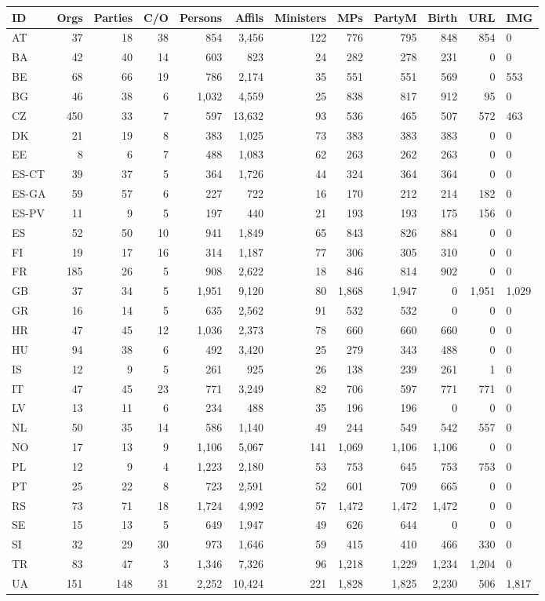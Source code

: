 \begin{tabular}{l|rrr|rrrrrrr}
ID&Orgs&Parties&C/O&Persons&Affils&Ministers&MPs&PartyM&Birth&URL&IMG\\
\hline
AT&37&18&38&854&3,456&122&776&795&848&854&0\\
BA&42&40&14&603&823&24&282&278&231&0&0\\
BE&68&66&19&786&2,174&35&551&551&569&0&553\\
BG&46&38&6&1,032&4,559&25&838&817&912&95&0\\
CZ&450&33&7&597&13,632&93&536&465&507&572&463\\
DK&21&19&8&383&1,025&73&383&383&383&0&0\\
EE&8&6&7&488&1,083&62&263&262&263&0&0\\
ES-CT&39&37&5&364&1,726&44&324&364&364&0&0\\
ES-GA&59&57&6&227&722&16&170&212&214&182&0\\
ES-PV&11&9&5&197&440&21&193&193&175&156&0\\
ES&52&50&10&941&1,849&65&843&826&884&0&0\\
FI&19&17&16&314&1,187&77&306&305&310&0&0\\
FR&185&26&5&908&2,622&18&846&814&902&0&0\\
GB&37&34&5&1,951&9,120&80&1,868&1,947&0&1,951&1,029\\
GR&16&14&5&635&2,562&91&532&532&0&0&0\\
HR&47&45&12&1,036&2,373&78&660&660&660&0&0\\
HU&94&38&6&492&3,420&25&279&343&488&0&0\\
IS&12&9&5&261&925&26&138&239&261&1&0\\
IT&47&45&23&771&3,249&82&706&597&771&771&0\\
LV&13&11&6&234&488&35&196&196&0&0&0\\
NL&50&35&14&586&1,140&49&244&549&542&557&0\\
NO&17&13&9&1,106&5,067&141&1,069&1,106&1,106&0&0\\
PL&12&9&4&1,223&2,180&53&753&645&753&753&0\\
PT&25&22&8&723&2,591&52&601&709&665&0&0\\
RS&73&71&18&1,724&4,992&57&1,472&1,472&1,472&0&0\\
SE&15&13&5&649&1,947&49&626&644&0&0&0\\
SI&32&29&30&973&1,646&59&415&410&466&330&0\\
TR&83&47&3&1,346&7,326&96&1,218&1,229&1,234&1,204&0\\
UA&151&148&31&2,252&10,424&221&1,828&1,825&2,230&506&1,817\\
\end{tabular}
